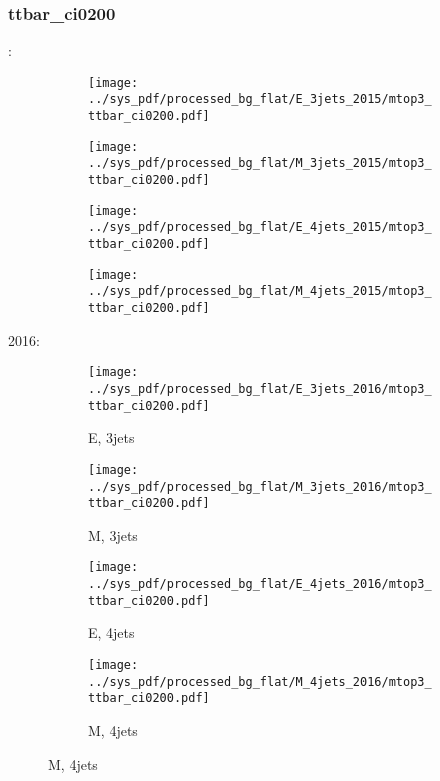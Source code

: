 \documentclass{beamer}
\begin{document}
\begin{frame}
\frametitle{ttbar_ci0200}
\fontsize{5}{1}:
\begin{figure}
\centering
\begin{subfigure}[b]{0.24\textwidth}
\texttt{[image: ../sys\_pdf/processed\_bg\_flat/E\_3jets\_2015/mtop3\_ttbar\_ci0200.pdf]}
\end{subfigure}
\begin{subfigure}[b]{0.24\textwidth}
\texttt{[image: ../sys\_pdf/processed\_bg\_flat/M\_3jets\_2015/mtop3\_ttbar\_ci0200.pdf]}
\end{subfigure}
\begin{subfigure}[b]{0.24\textwidth}
\texttt{[image: ../sys\_pdf/processed\_bg\_flat/E\_4jets\_2015/mtop3\_ttbar\_ci0200.pdf]}
\end{subfigure}
\begin{subfigure}[b]{0.24\textwidth}
\texttt{[image: ../sys\_pdf/processed\_bg\_flat/M\_4jets\_2015/mtop3\_ttbar\_ci0200.pdf]}
\end{subfigure}
\end{figure}
2016:
\begin{figure}
\centering
\begin{subfigure}[b]{0.24\textwidth}
\texttt{[image: ../sys\_pdf/processed\_bg\_flat/E\_3jets\_2016/mtop3\_ttbar\_ci0200.pdf]}
\captionsetup{font=tiny}
\caption{E, 3jets}
\end{subfigure}
\begin{subfigure}[b]{0.24\textwidth}
\texttt{[image: ../sys\_pdf/processed\_bg\_flat/M\_3jets\_2016/mtop3\_ttbar\_ci0200.pdf]}
\captionsetup{font=tiny}
\caption{M, 3jets}
\end{subfigure}
\begin{subfigure}[b]{0.24\textwidth}
\texttt{[image: ../sys\_pdf/processed\_bg\_flat/E\_4jets\_2016/mtop3\_ttbar\_ci0200.pdf]}
\captionsetup{font=tiny}
\caption{E, 4jets}
\end{subfigure}
\begin{subfigure}[b]{0.24\textwidth}
\texttt{[image: ../sys\_pdf/processed\_bg\_flat/M\_4jets\_2016/mtop3\_ttbar\_ci0200.pdf]}
\captionsetup{font=tiny}
\caption{M, 4jets}
\end{subfigure}
\end{figure}
\end{frame}
\end{document}
